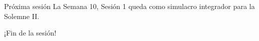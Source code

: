 \documentclass[10pt]{beamer}
\begin{document}
\begin{frame}{Próxima sesión}
La Semana 10, Sesión 1 queda como simulacro integrador para la Solemne II.
\end{frame}

\begin{frame}\Huge{\centerline{¡Fin de la sesión!}}\end{frame}
\end{document}
